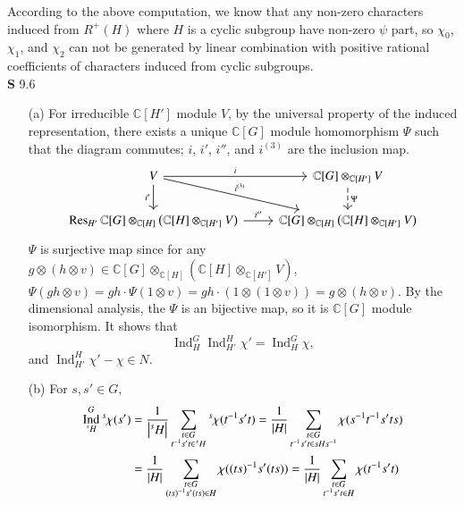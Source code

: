 \documentclass[a4paper, 12pt]{article}
\theoremstyle{Mydefinition}
\theoremstyle{Mytheorem}
\DeclareMathOperator{\Ind}{Ind}
\begin{document}
According to the above computation, we know that any non-zero characters induced from $R^+(H)$ where $H$ is a cyclic subgroup have non-zero $\psi$ part, so $\chi_0$, $\chi_1$, and $\chi_2$ can not be generated by linear combination with positive rational coefficients of characters induced from cyclic subgroups.\\

\noindent \textbf{S} 9.6
\begin{enumerate}
    \item[(a)] For irreducible $\mathbb{C}[H']$ module $V$, by the universal property of the induced representation, there exists a unique $\mathbb{C}[G]$ module homomorphism $\Psi$ such that the diagram commutes; $i$, $i'$, $i''$, and $i^{(3)}$ are the inclusion map.
    \[
    \begin{tikzcd}
    V \arrow{dr}{i^{(3)}}\arrow{r}{i} \arrow[swap]{d}{i'} & \mathbb{C}[G]\otimes_{\mathbb{C}[H']}V \arrow[dashed]{d}{\Psi} \\
    \Res_{H'} \mathbb{C}[G]\otimes_{\mathbb{C}[H]}\left(\mathbb{C}[H]\otimes_{\mathbb{C}[H']}V\right)  \arrow{r}{i''} & 
    \mathbb{C}[G]\otimes_{\mathbb{C}[H]}\left(\mathbb{C}[H]\otimes_{\mathbb{C}[H']}V\right)
    \end{tikzcd}
    \]
    $\Psi$ is surjective map since for any $g\otimes (h\otimes v)\in \mathbb{C}[G]\otimes_{\mathbb{C}[H]}\left(\mathbb{C}[H]\otimes_{\mathbb{C}[H']}V\right)$, $\Psi(gh\otimes v) = gh\cdot \Psi(1\otimes v) = gh\cdot (1\otimes (1\otimes v)) = g\otimes (h\otimes v)$. By the dimensional analysis, the $\Psi$ is an bijective map, so it is $\mathbb{C}[G]$ module isomorphism. It shows that 
    \begin{equation}
        \Ind_H^G \Ind_{H'}^H \chi' = \Ind_{H}^G \chi,
    \end{equation}
    and $\Ind_{H'}^H \chi' - \chi\in N$.
    \item[(b)] For $s,s'\in G$,
    \begin{equation}
    \begin{split}
        \Ind_{\prescript{s}{\phantom{1}}{H}}^G\prescript{s}{\phantom{1}}{\chi}(s') &= \frac{1}{\abs{\prescript{s}{\phantom{s}}{H}}}\sum_{\substack{t\in G\\ t^{-1}s't\in \prescript{s}{\phantom{1}}{H}}}\prescript{s}{\phantom{1}}{\chi}(t^{-1}s't) =\frac{1}{\abs{H}}\sum_{\substack{t\in G\\ t^{-1}s't\in sHs^{-1}}}\chi(s^{-1}t^{-1}s'ts)\\
        &=\frac{1}{\abs{H}}\sum_{\substack{t\in G\\ (ts)^{-1}s'(ts)\in H}}\chi((ts)^{-1}s'(ts))=\frac{1}{\abs{H}}\sum_{\substack{t\in G\\ t^{-1}s't\in H}}\chi(t^{-1}s't)\\

\end{split}
\end{equation}
\end{enumerate}
\end{document}
